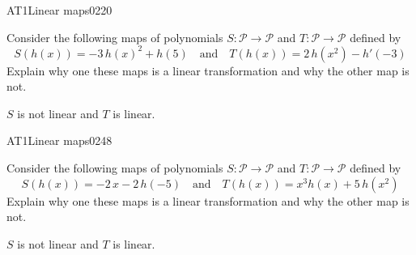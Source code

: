 \begin{exercise}{AT1}{Linear maps}{0220} 
\begin{exerciseStatement} 

 Consider the following maps of polynomials \(S:\mathcal{P}\rightarrow\mathcal{P}\) and \(T:\mathcal{P}\rightarrow\mathcal{P}\) defined by \[
            S(h(x))=
                    -3 \, h\left(x\right)^{2} + h\left(5\right)
                \hspace{1em} \text{and} \hspace{1em}
            T(h(x))=
                    2 \, h\left(x^{2}\right) - h'\left(-3\right)
        \] Explain why one these maps is a linear transformation and why the other map is not. 

 \end{exerciseStatement}
 \begin{exerciseAnswer} 

\(S\) is not linear and \(T\) is linear.

 \end{exerciseAnswer}
 \end{exercise}



\begin{exercise}{AT1}{Linear maps}{0248} 
\begin{exerciseStatement} 

 Consider the following maps of polynomials \(S:\mathcal{P}\rightarrow\mathcal{P}\) and \(T:\mathcal{P}\rightarrow\mathcal{P}\) defined by \[
            S(h(x))=
                    -2 \, x - 2 \, h\left(-5\right)
                \hspace{1em} \text{and} \hspace{1em}
            T(h(x))=
                    x^{3} h\left(x\right) + 5 \, h\left(x^{2}\right)
        \] Explain why one these maps is a linear transformation and why the other map is not. 

 \end{exerciseStatement}
 \begin{exerciseAnswer} 

\(S\) is not linear and \(T\) is linear.

 \end{exerciseAnswer}
 \end{exercise}


\newpage




